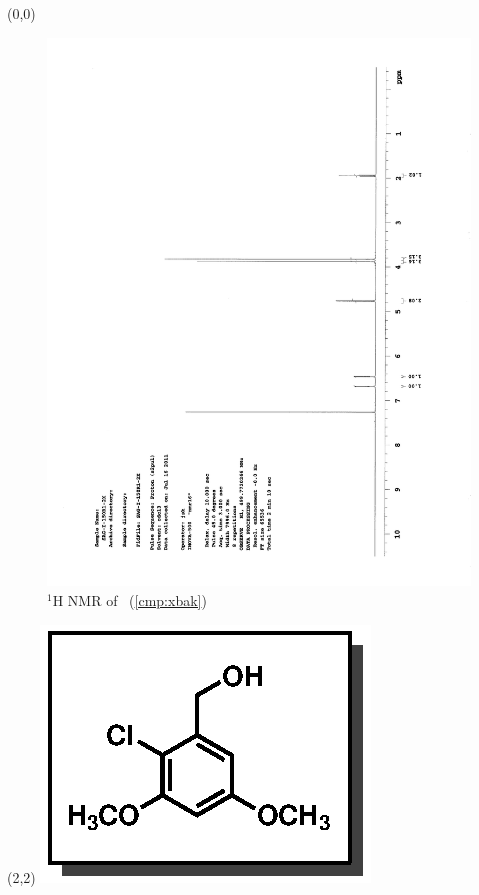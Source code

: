 \begin{textblock}{20}(0,0)
\begin{figure}[htb]
\caption{$^1$H NMR of \CMPxbak\ (\ref{cmp:xbak})}
\includegraphics[scale=0.75, trim = 0mm 0mm 0mm 5mm,
clip]{chp_singlecarbon/images/nmr/xbakH}
\vspace{-100pt}
\end{figure}
\end{textblock}
\begin{textblock}{1}(2,2)
\includegraphics[scale=0.8, angle=90]{chp_singlecarbon/images/xbak}
\end{textblock}
